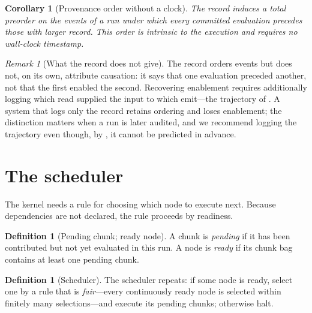 \documentclass[11pt,a4paper]{article}
\theoremstyle{thmstyle}
\newtheorem{corollary}[theorem]{Corollary}
\theoremstyle{definition}
\newtheorem{definition}[theorem]{Definition}
\theoremstyle{remark}
\newtheorem{remark}[theorem]{Remark}
\begin{document}
\begin{corollary}[Provenance order without a clock]
\label{cor:clock}
The record induces a total preorder on the events of a run under which every
committed evaluation precedes those with larger record. This order is
intrinsic to the execution and requires no wall-clock timestamp.
\end{corollary}

\begin{remark}[What the record does not give]
\label{rem:record-limits}
The record orders events but does not, on its own, attribute causation: it
says that one evaluation preceded another, not that the first enabled the
second. Recovering enablement requires additionally logging which read
supplied the input to which emit---the trajectory of
. A system that logs only the record retains ordering
and loses enablement; the distinction matters when a run is later audited,
and we recommend logging the trajectory even though, by
, it cannot be predicted in advance.
\end{remark}

\section{The scheduler}
\label{sec:scheduler}

The kernel needs a rule for choosing which node to execute next. Because
dependencies are not declared, the rule proceeds by readiness.

\begin{definition}[Pending chunk; ready node]
\label{def:ready}
A chunk is \emph{pending} if it has been contributed but not yet evaluated
in this run. A node is \emph{ready} if its chunk bag contains at least one
pending chunk.
\end{definition}

\begin{definition}[Scheduler]
\label{def:scheduler}
The scheduler repeats: if some node is ready, select one by a rule that is
\emph{fair}---every continuously ready node is selected within finitely many
selections---and execute its pending chunks; otherwise halt.
\end{definition}
\end{document}
